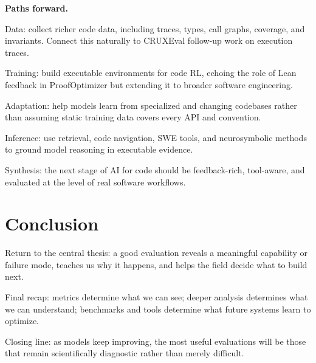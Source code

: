 \documentclass[10pt,twocolumn]{article}
\let\olditemize\itemize
\let\oldenditemize\enditemize
\renewenvironment{itemize}{\olditemize
  \setlength{\itemsep}{1pt}
  \setlength{\parskip}{0pt}
  \setlength{\parsep}{0pt}
  \setlength{\topsep}{2pt}
}{\oldenditemize}
\begin{document}
\textbf{Paths forward.}
\begin{itemize}
  \item Data: collect richer code data, including traces, types, call graphs, coverage, and invariants. Connect this naturally to CRUXEval follow-up work on execution traces.
  \item Training: build executable environments for code RL, echoing the role of Lean feedback in ProofOptimizer but extending it to broader software engineering.
  \item Adaptation: help models learn from specialized and changing codebases rather than assuming static training data covers every API and convention.
  \item Inference: use retrieval, code navigation, SWE tools, and neurosymbolic methods to ground model reasoning in executable evidence.
  \item Synthesis: the next stage of AI for code should be feedback-rich, tool-aware, and evaluated at the level of real software workflows.
\end{itemize}

\section*{Conclusion}

\begin{itemize}
  \item Return to the central thesis: a good evaluation reveals a meaningful capability or failure mode, teaches us why it happens, and helps the field decide what to build next.
  \item Final recap: metrics determine what we can see; deeper analysis determines what we can understand; benchmarks and tools determine what future systems learn to optimize.
  \item Closing line: as models keep improving, the most useful evaluations will be those that remain scientifically diagnostic rather than merely difficult.
\end{itemize}
\end{document}
